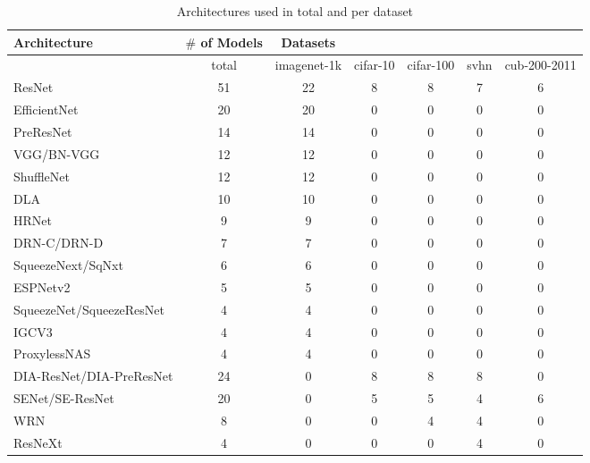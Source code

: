 
\begin{table}[t]
\small
\begin{center}
\begin{tabular}{|l|c|c|c|c|c|c|}
\hline
Architecture & $\#$ of Models & Datasets & & & & \\
\hline

  & total &imagenet-1k & cifar-10 & cifar-100 & svhn & cub-200-2011 \\
\hline
ResNet & 51 &22 & 8 & 8 & 7 & 6 \\
EfficientNet & 20 &20 & 0 & 0 & 0 & 0 \\
PreResNet & 14 &14 & 0 & 0 & 0 & 0 \\
VGG/BN-VGG & 12 &12 & 0 & 0 & 0 & 0 \\
ShuffleNet & 12 &12 & 0 & 0 & 0 & 0 \\
DLA & 10 &10 & 0 & 0 & 0 & 0 \\
HRNet & 9 &9 & 0 & 0 & 0 & 0 \\
DRN-C/DRN-D & 7 &7 & 0 & 0 & 0 & 0 \\
SqueezeNext/SqNxt & 6 &6 & 0 & 0 & 0 & 0 \\
ESPNetv2 & 5 &5 & 0 & 0 & 0 & 0 \\
SqueezeNet/SqueezeResNet & 4 &4 & 0 & 0 & 0 & 0 \\
IGCV3 & 4 &4 & 0 & 0 & 0 & 0 \\
ProxylessNAS & 4 &4 & 0 & 0 & 0 & 0 \\
DIA-ResNet/DIA-PreResNet & 24 &0 & 8 & 8 & 8 & 0 \\
SENet/SE-ResNet & 20 &0 & 5 & 5 & 4 & 6 \\
WRN & 8 &0 & 0 & 4 & 4 & 0 \\
ResNeXt & 4 &0 & 0 & 0 & 4 & 0 \\

\hline
\end{tabular}
\end{center}
\caption{Architectures used in total and per dataset}
\label{table:architectures}
\end{table}

